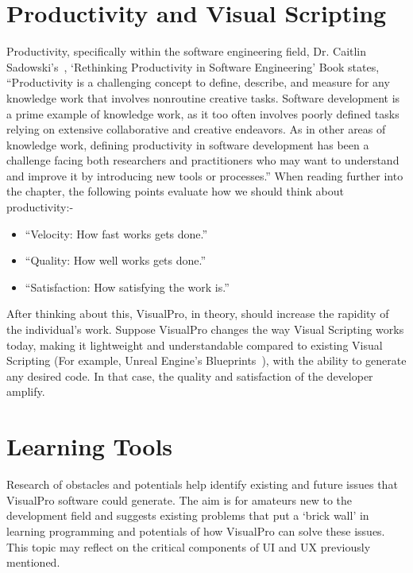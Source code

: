 \documentclass[12pt]{report} %
\begin{document}
	\section{Productivity and Visual Scripting}
	\label{sec:productivityVisualScripting}
		Productivity, specifically within the software engineering field, Dr. Caitlin Sadowski's~\cite{dr_caitlin_sadowski_rethinking_2019}, `Rethinking Productivity in Software Engineering' Book states, ``Productivity is a challenging concept to define, describe, and measure for any knowledge work that involves nonroutine creative tasks. Software development is a prime example of knowledge work, as it too often involves poorly defined tasks relying on extensive collaborative and creative endeavors. As in other areas of knowledge work, defining productivity in software development has been a challenge facing both researchers and practitioners who may want to understand and improve it by introducing new tools or processes.'' When reading further into the chapter, the following points evaluate how we should think about productivity:-

		\begin{itemize}
		\item ``Velocity: How fast works gets done.''~\cite{dr_caitlin_sadowski_rethinking_2019}
		\item ``Quality: How well works gets done.''~\cite{dr_caitlin_sadowski_rethinking_2019}
		\item ``Satisfaction: How satisfying the work is.''~\cite{dr_caitlin_sadowski_rethinking_2019}
		\end{itemize}

		After thinking about this, VisualPro, in theory, should increase the rapidity of the individual's work. Suppose VisualPro changes the way Visual Scripting works today, making it lightweight and understandable compared to existing Visual Scripting (For example, Unreal Engine's Blueprints~\cite{unreal_engine_introduction_nodate}), with the ability to generate any desired code. In that case, the quality and satisfaction of the developer amplify.

	\section{Learning Tools}
		Research of obstacles and potentials help identify existing and future issues that VisualPro software could generate. The aim is for amateurs new to the development field and suggests existing problems that put a `brick wall' in learning programming and potentials of how VisualPro can solve these issues. This topic may reflect on the critical components of UI and UX previously mentioned.
\end{document}
